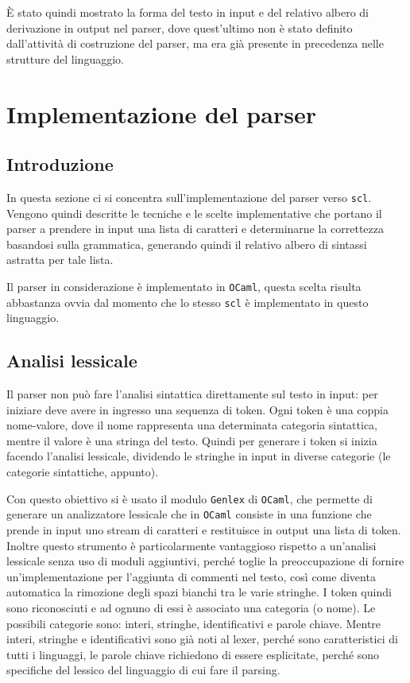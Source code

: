 \documentclass[]{article}
\begin{document}
È stato quindi mostrato la forma del testo in input e del relativo
albero di derivazione in output nel parser, dove quest'ultimo non è
stato definito dall'attività di costruzione del parser, ma era già
presente in precedenza nelle strutture del linguaggio.

\hypertarget{implementazione-del-parser}{%
\section{Implementazione del parser}\label{implementazione-del-parser}}

\hypertarget{introduzione-3}{%
\subsection{Introduzione}\label{introduzione-3}}

In questa sezione ci si concentra sull'implementazione del parser verso
\texttt{scl}. Vengono quindi descritte le tecniche e le scelte
implementative che portano il parser a prendere in input una lista di
caratteri e determinarne la correttezza basandosi sulla grammatica,
generando quindi il relativo albero di sintassi astratta per tale lista.

Il parser in considerazione è implementato in \texttt{OCaml}, questa
scelta risulta abbastanza ovvia dal momento che lo stesso \texttt{scl} è
implementato in questo linguaggio.

\hypertarget{analisi-lessicale}{%
\subsection{Analisi lessicale}\label{analisi-lessicale}}

Il parser non può fare l'analisi sintattica direttamente sul testo in
input: per iniziare deve avere in ingresso una sequenza di token. Ogni
token è una coppia nome-valore, dove il nome rappresenta una determinata
categoria sintattica, mentre il valore è una stringa del testo. Quindi
per generare i token si inizia facendo l'analisi lessicale, dividendo le
stringhe in input in diverse categorie (le categorie sintattiche,
appunto).

Con questo obiettivo si è usato il modulo \texttt{Genlex} di
\texttt{OCaml}, che permette di generare un analizzatore lessicale che
in \texttt{OCaml} consiste in una funzione che prende in input uno
stream di caratteri e restituisce in output una lista di token. Inoltre
questo strumento è particolarmente vantaggioso rispetto a un'analisi
lessicale senza uso di moduli aggiuntivi, perché toglie la
preoccupazione di fornire un'implementazione per l'aggiunta di commenti
nel testo, così come diventa automatica la rimozione degli spazi bianchi
tra le varie stringhe. I token quindi sono riconosciuti e ad ognuno di
essi è associato una categoria (o nome). Le possibili categorie sono:
interi, stringhe, identificativi e parole chiave. Mentre interi,
stringhe e identificativi sono già noti al lexer, perché sono
caratteristici di tutti i linguaggi, le parole chiave richiedono di
essere esplicitate, perché sono specifiche del lessico del linguaggio di
cui fare il parsing.
\end{document}
